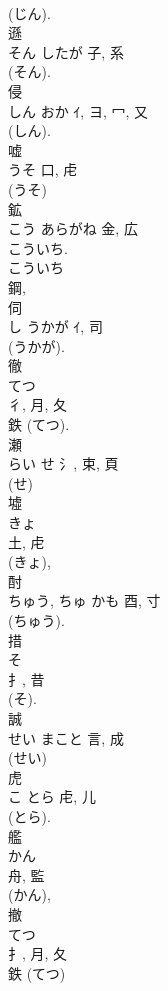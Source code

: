 \documentclass[8pt]{extreport}
\begin{document}
\begin{CJK}{UTF8}{min}
\\	(じん). 
\\	遜	
\\	そん	したが	子, 系		
\\	(そん). 
\\	侵	
\\	しん	おか	ｲ, ヨ, 冖, 又	
\\	(しん). 
\\	嘘	
\\	うそ	口, 虍		
\\	(うそ) 
\\	鉱	
\\	こう	あらがね	金, 広	
\\	こういち.	
\\	こういち 
\\	鋼, 
\\	伺	
\\	し	うかが	ｲ, 司	
\\	(うかが). 
\\	徹	
\\	てつ	
\\	彳, 月, 夂		
\\	鉄 (てつ).	
\\	瀬	
\\	らい	せ	氵, 束, 頁	
\\	(せ) 
\\	墟	
\\	きょ	
\\	土, 虍		
\\	(きょ), 
\\	酎	
\\	ちゅう, ちゅ	かも	酉, 寸	
\\	(ちゅう). 
\\	措	
\\	そ	
\\	扌, 昔	
\\	(そ). 
\\	誠	
\\	せい	まこと	言, 成	
\\	(せい) 
\\	虎	
\\	こ	とら	虍, 儿	
\\	(とら). 
\\	艦	
\\	かん	
\\	舟, 監	
\\	(かん), 
\\	撤	
\\	てつ	
\\	扌, 月, 夂		
\\	鉄 (てつ) 

\end{CJK}
\end{document}
